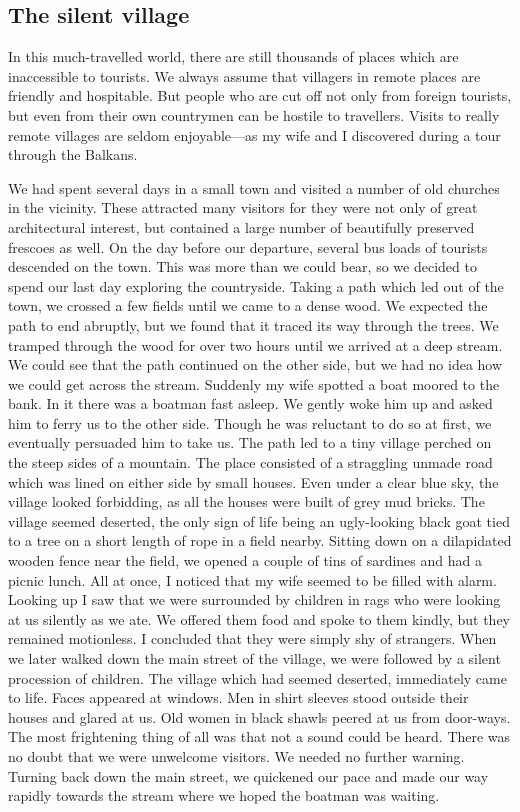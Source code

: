 \documentclass[11pt]{article}
\begin{document}
\subsection{The silent village}
\label{sec-1-48}

In this much-travelled world, there are still thousands of places which are inaccessible to tourists. We always assume that villagers in remote places are friendly and hospitable. But people who are cut off not only from foreign tourists, but even from their own countrymen can be hostile to travellers. Visits to really remote villages are seldom enjoyable---as my wife and I discovered during a tour through the Balkans. 

We had spent several days in a small town and visited a number of old churches in the vicinity. These attracted many visitors for they were not only of great architectural interest, but contained a large number of beautifully preserved frescoes as well. On the day before our departure, several bus loads of tourists descended on the town. This was more than we could bear, so we decided to spend our last day exploring the countryside. Taking a path which led out of the town, we crossed a few fields until we came to a dense wood. We expected the path to end abruptly, but we found that it traced its way through the trees. We tramped through the wood for over two hours until we arrived at a deep stream. We could see that the path continued on the other side, but we had no idea how we could get across the stream. Suddenly my wife spotted a boat moored to the bank. In it there was a boatman fast asleep. We gently woke him up and asked him to ferry us to the other side. Though he was reluctant to do so at first, we eventually persuaded him to take us. The path led to a tiny village perched on the steep sides of a mountain. The place consisted of a straggling unmade road which was lined on either side by small houses. Even under a clear blue sky, the village looked forbidding, as all the houses were built of grey mud bricks. The village seemed deserted, the only sign of life being an ugly-looking black goat tied to a tree on a short length of rope in a field nearby. Sitting down on a dilapidated wooden fence near the field, we opened a couple of tins of sardines and had a picnic lunch. All at once, I noticed that my wife seemed to be filled with alarm. Looking up I saw that we were surrounded by children in rags who were looking at us silently as we ate. We offered them food and spoke to them kindly, but they remained motionless. I concluded that they were simply shy of strangers. When we later walked down the main street of the village, we were followed by a silent procession of children. The village which had seemed deserted, immediately came to life. Faces appeared at windows. Men in shirt sleeves stood outside their houses and glared at us. Old women in black shawls peered at us from door-ways. The most frightening thing of all was that not a sound could be heard. There was no doubt that we were unwelcome visitors. We needed no further warning. Turning back down the main street, we quickened our pace and made our way rapidly towards the stream where we hoped the boatman was waiting. 
\end{document}
